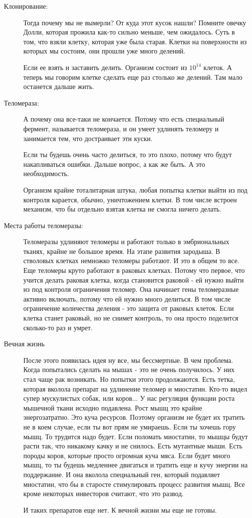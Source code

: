 \begin{description}
\item[Клонирование:]
Тогда почему мы не вымерли?
От куда этот кусок нашли? Помните овечку Долли, которая прожила как-то
сильно меньше, чем ожидалось. Суть в том, что взяли клетку,
которая уже была старая. Клетки на поверхности из
которых мы состоим, они прошли уже много делений.

Если ее взять и заставить делить. Организм состоит из $10^14$ клеток.
А теперь мы говорим клетке сделать еще раз столько же
делений. Там мало останется дальше жить.

\item[Теломераза:]
А почему она все-таки не кончается. Потому что есть специальный
фермент, называется теломераза, и он умеет удлинять теломеру и занимается
тем, что достраивает эти куски.

Если ты будешь очень часто делиться, то это плохо,
потому что будут накапливаться ошибки. Дальше вопрос,
а как же быть. А это необходимость.

Организм крайне тоталитарная штука, любая попытка клетки
выйти из под контроля карается, обычно,
уничтожением клетки. В том числе встроен механизм, что бы
отдельно взятая клетка не смогла ничего делать.

\item[Места работы теломеразы:]
Теломеразы удлиняют теломеры и работают только в эмбриональных
тканях, крайне не большое время. На этапе развития зародыша.
В стволовых клетках немножко теломеры работают.
И это в общем то все. Еще теломеры круто работают в
раковых клетках. Потому что первое,
что учится делать раковая клетка, когда становится раковой -
ей нужно выйти из под контроля ограничения теломер. Она
начинает гены теломеразные активно включать,
потому что ей нужно много делиться. В том числе
ограничение количества деления - это
защита от раковых клеток. Если клетка станет раковый, но не снимет контроль, то она просто
поделится сколько-то раз и умрет.

\item[Вечная жизнь]
После этого появилась идея ну все, мы бессмертные. В чем проблема.
Когда попытались сделать на мышах - это не очень получилось.
У них стал чаще рак возникать. Но попытки этого продолжаются.
Есть тетка, которая вколола препарат на удлинение теломер и миостатин.
Кто-то видел супер мускулистых собак, или коров... У нас регуляция
функции роста мышечной ткани исходно подавлена. Рост мышц это
крайне энергозатратно. Это куча ресурсов. Поэтому организм не будет
их тратить не в коем случае, если ты вот прям не умираешь. Если ты 
хочешь гору мышц. То трудится надо будет. Если поломать миостатин, 
то мышцы будут расти так, что никакому качку и не снилось. 
Есть мутантные мыши. Есть породы коров, которые просто огромная куча мяса. 
Если будет много мышц, то ты будешь медленнее двигаться и тратить еще и 
кучу энергии на поддержание. И она вколола специальный
ген, который подавляет миостатин, что бы в старосте стимулировать
процесс развития мышц. Все кроме некоторых инвесторов считают, что
это развод.

И таких препаратов еще нет. К вечной жизни мы еще не готовы. 
\end{description}

